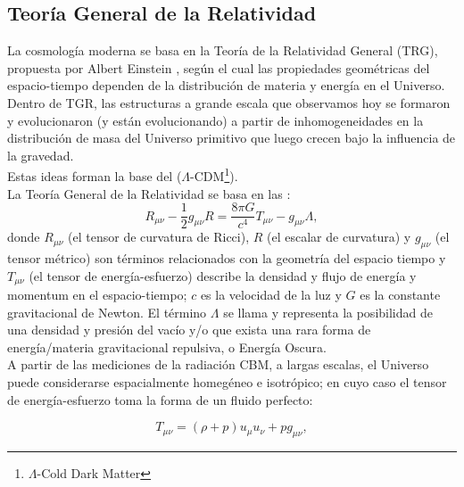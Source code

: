 

\subsection{Teor\'ia General de la Relatividad}



La cosmolog\'ia moderna se basa en la Teoría de la Relatividad General (TRG), propuesta por
Albert Einstein \citep{1917AE}, seg\'un el cual las propiedades geom\'etricas del espacio-tiempo
dependen de la distribución de materia y energ\'ia en el Universo. Dentro de TGR, las estructuras a grande escala que observamos hoy se formaron y evolucionaron (y est\'an evolucionando) a partir de 
inhomogeneidades en la distribución de masa del Universo primitivo que luego crecen bajo la influencia de la gravedad. \\

Estas ideas forman la base del  ($\Lambda$-CDM\footnote{$\Lambda$-Cold Dark Matter}). \\

La Teor\'ia General de la Relatividad se basa en las :
\begin{equation}
R_{\mu \nu}-\frac{1}{2}g_{\mu \nu} R=\frac{8 \pi G}{c^4}T_{\mu \nu}-g_{\mu \nu}\Lambda,
\end{equation}
donde $R_{\mu \nu}$ (el tensor de curvatura de Ricci), $R$ (el escalar de curvatura) y $g_{\mu \nu}$ (el tensor m\'etrico) son t\'erminos relacionados con la geometr\'ia del espacio tiempo y $T_{\mu \nu}$ (el tensor de energ\'ia-esfuerzo) describe la densidad y flujo de energ\'ia y momentum en el espacio-tiempo; $c$ es la velocidad de la luz y $G$ es la constante gravitacional de Newton. El t\'ermino $\Lambda$ se llama  y representa la posibilidad de una densidad y presi\'on del vac\'io y/o que exista una rara forma de energ\'ia/materia gravitacional repulsiva, o Energ\'ia Oscura. \\

A partir de las mediciones de la radiaci\'on CBM, a largas escalas, el Universo puede considerarse espacialmente homeg\'eneo e isotr\'opico; en cuyo caso el tensor de energ\'ia-esfuerzo toma la forma de un fluido perfecto:

\begin{equation}
T_{\mu \nu}=(\rho + p)u_\mu u_\nu +pg_{\mu \nu},
\end{equation}

